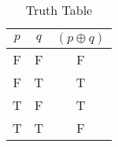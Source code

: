 \begin{table}[ht]
\caption{Truth Table}
\centering
\begin{tabular}{|c|c||c|}
\hline
$ p $ & $ q $ & $ (p \oplus q) $ \\
\hline
F & F & F \\
F & T & T \\
T & F & T \\
T & T & F \\
\hline
\end{tabular}
\label{table:tt1}
\end{table}
